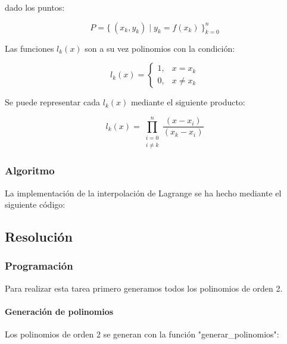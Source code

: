 dado los puntos:

$$P = \{~ (x_k, y_k) \mid y_k = f(x_k)~ \}_{k=0}^{n}$$

Las funciones $l_k(x)$ son a su vez polinomios con la condición:


\begin{equation}
	l_k(x) = 
	\begin{cases}
		1, & x = x_k \\
		0, & x \neq x_k	
	\end{cases}  
\end{equation}

Se puede representar cada $l_k(x)$ mediante el siguiente producto:

\begin{equation}
	l_k(x) = \prod_{\substack{i = 0 \\ i \neq k}}^{n} \frac{ (x - x_i) }{ (x_k - x_i)}
\end{equation}

\newpage

\subsubsection{Algoritmo}

La implementación de la interpolación de Lagrange se ha hecho mediante el siguiente código:



\newpage

\subsection{Resolución}

\subsubsection{Programación}

Para realizar esta tarea primero generamos todos los polinomios de orden 2.

\paragraph{Generación de polinomios}\label{gen_polynomials}

Los polinomios de orden 2 se generan con la función "generar\_polinomios":




